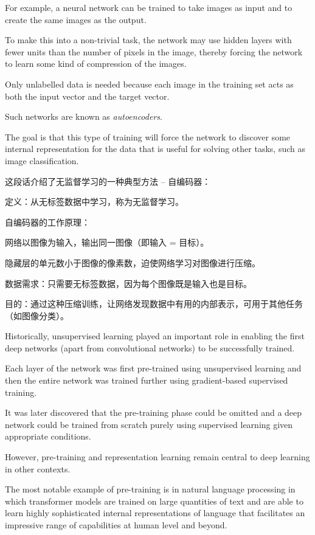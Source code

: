 \documentclass{article}
\begin{document}
For example, a neural network can be trained to take images as input and to create the same images as the output. 

To make this into a non-trivial task, the network may use hidden layers with fewer units than the number of pixels in the image, thereby forcing the network to learn some kind of compression of the images. 

Only unlabelled data is needed because each image in the training set acts as both the input vector and the target vector. 

Such networks are known as \emph{autoencoders}. 

The goal is that this type of training will force the network to discover some internal representation for the data that is useful for solving other tasks, such as image classification.

{\color{red}
这段话介绍了无监督学习的一种典型方法 -- 自编码器：

定义：从无标签数据中学习，称为无监督学习。

自编码器的工作原理：

网络以图像为输入，输出同一图像（即输入 = 目标）。

隐藏层的单元数小于图像的像素数，迫使网络学习对图像进行压缩。

数据需求：只需要无标签数据，因为每个图像既是输入也是目标。

目的：通过这种压缩训练，让网络发现数据中有用的内部表示，可用于其他任务（如图像分类）。
}

Historically, unsupervised learning played an important role in enabling the first deep networks (apart from convolutional networks) to be successfully trained. 

Each layer of the network was first pre-trained using unsupervised learning and then the entire network was trained further using gradient-based supervised training. 

It was later discovered that the pre-training phase could be omitted and a deep network could be trained from scratch purely using supervised learning given appropriate conditions.

However, pre-training and representation learning remain central to deep learning in other contexts. 

The most notable example of pre-training is in natural language processing in which transformer models are trained on large quantities of text and are able to learn highly sophisticated internal representations of language that facilitates an impressive range of capabilities at human level and beyond.
\end{document}

